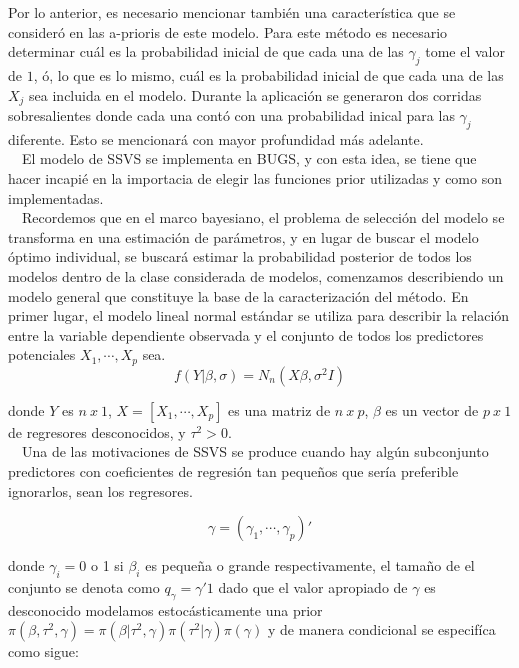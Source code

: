 \documentclass[DIV=calc, 
					paper=letter, 
					fontsize=11pt, 
					twocolumn]{scrartcl}
\begin{document}
Por lo anterior, es necesario mencionar tambi\'en una caracter\'istica que se consider\'o en las a-prioris de este modelo. Para este m\'etodo es necesario determinar cu\'al es la probabilidad inicial de que cada una de las $\gamma_j$ tome el valor de $1$, \'o, lo que es lo mismo, cu\'al es la probabilidad inicial de que cada una de las $X_j$ sea incluida en el modelo. Durante la aplicaci\'on se generaron dos corridas sobresalientes donde cada una cont\'o con una probabilidad inical para las $\gamma_j$ diferente. Esto se mencionar\'a con mayor profundidad m\'as adelante.\\

~~El modelo de SSVS se implementa en BUGS, y con esta idea, se tiene que hacer incapi\'e en la importacia de elegir las funciones prior utilizadas y como son implementadas.\\

~~Recordemos que en el marco bayesiano, el problema de selecci\'on del modelo se transforma en una estimaci\'on de par\'ametros, y en lugar de buscar el modelo \'optimo individual, se buscar\'a estimar la probabilidad posterior de todos los modelos dentro de la clase considerada de modelos, comenzamos describiendo un modelo general que constituye la base de la caracterizaci\'on del m\'etodo. En primer lugar, el modelo lineal normal est\'andar se utiliza para describir la relaci\'on entre la variable dependiente observada y el conjunto de todos los predictores potenciales $X_1,\cdots,X_p$ sea.\\

\begin{equation}
f(Y|\beta,\sigma) = N_n (X\beta,\sigma^2 I)
\end{equation}

donde $Y$ es $n~x~1$, $X=[X_1,\cdots,X_p]$ es una matriz de $n~x~p$, $\beta$ es un vector de $p~x~1$ de regresores desconocidos, y $\tau ^{2} >0$.\\

~~Una de las motivaciones de SSVS se produce cuando hay alg\'un subconjunto predictores con coeficientes de regresi\'on tan peque\~nos que ser\'ia preferible ignorarlos, sean los regresores.

\begin{equation}
\gamma = ( \gamma_1, \cdots, \gamma_p)'
\end{equation}

donde $\gamma_i=0$ o 1 si $\beta_i$ es peque\~na o grande respectivamente, el tama\~no de el conjunto se denota como $q_\gamma = \gamma ' 1$ dado que el valor apropiado de $\gamma$ es desconocido modelamos estoc\'asticamente una prior $\pi (\beta, \tau ^{2}, \gamma)=\pi(\beta | \tau ^{2}, \gamma )\pi (\tau ^{2} | \gamma) \pi(\gamma)$ y de manera condicional se especif\'ica como sigue:
\end{document}
